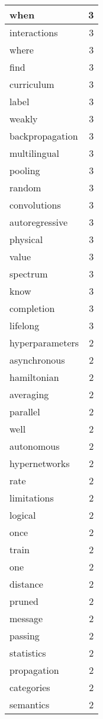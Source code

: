 \begin{table}[h]
\begin{tabular}{|l|r|}
\hline
when & 3 \\
\hline
interactions & 3 \\
\hline
where & 3 \\
\hline
find & 3 \\
\hline
curriculum & 3 \\
\hline
label & 3 \\
\hline
weakly & 3 \\
\hline
backpropagation & 3 \\
\hline
multilingual & 3 \\
\hline
pooling & 3 \\
\hline
random & 3 \\
\hline
convolutions & 3 \\
\hline
autoregressive & 3 \\
\hline
physical & 3 \\
\hline
value & 3 \\
\hline
spectrum & 3 \\
\hline
know & 3 \\
\hline
completion & 3 \\
\hline
lifelong & 3 \\
\hline
hyperparameters & 2 \\
\hline
asynchronous & 2 \\
\hline
hamiltonian & 2 \\
\hline
averaging & 2 \\
\hline
parallel & 2 \\
\hline
well & 2 \\
\hline
autonomous & 2 \\
\hline
hypernetworks & 2 \\
\hline
rate & 2 \\
\hline
limitations & 2 \\
\hline
logical & 2 \\
\hline
once & 2 \\
\hline
train & 2 \\
\hline
one & 2 \\
\hline
distance & 2 \\
\hline
pruned & 2 \\
\hline
message & 2 \\
\hline
passing & 2 \\
\hline
statistics & 2 \\
\hline
propagation & 2 \\
\hline
categories & 2 \\
\hline
semantics & 2 \\
\hline

\end{tabular}
\end{table}
